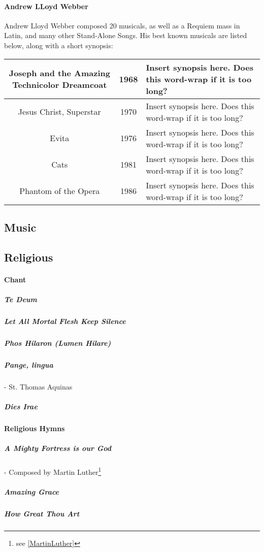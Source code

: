 		\paragraph{Andrew LLoyd Webber}
			Andrew Lloyd Webber composed 20 musicals, as well as a Requiem mass in Latin, and many other Stand-Alone Songs.  His best known musicals are listed below, along with a short synopsis:
			
				\begin{longtable}{|c|c|p{3in}|}
					\hline
					Joseph and the Amazing Technicolor Dreamcoat & 1968 & Insert synopsis here.  Does this word-wrap if it is too long?  \\
					\hline
					Jesus Christ, Superstar & 1970 & Insert synopsis here.  Does this word-wrap if it is too long?  \\
					\hline
					Evita & 1976 & Insert synopsis here.  Does this word-wrap if it is too long? \\
					\hline
					Cats & 1981 & Insert synopsis here.  Does this word-wrap if it is too long?  \\
					\hline
					Phantom of the Opera & 1986 & Insert synopsis here.  Does this word-wrap if it is too long? \\
					\hline
					
				
					
					
				\end{longtable}

		
		

		
	
		
	
		
		
		\subsection{Music}
			\subsection{Religious}
				\paragraph{Chant}
					\subparagraph{Te Deum}
					\subparagraph{Let All Mortal Flesh Keep Silence}
					\subparagraph{Phos Hilaron (Lumen Hilare)}
					\subparagraph{Pange, lingua} - St. Thomas Aquinas
					\subparagraph{Dies Irae}
				\paragraph{Religious Hymns}
					\subparagraph{A Mighty Fortress is our God} - Composed by Martin Luther\footnote{see \cref{MartinLuther} }
					\subparagraph{Amazing Grace}
					\subparagraph{How Great Thou Art}


